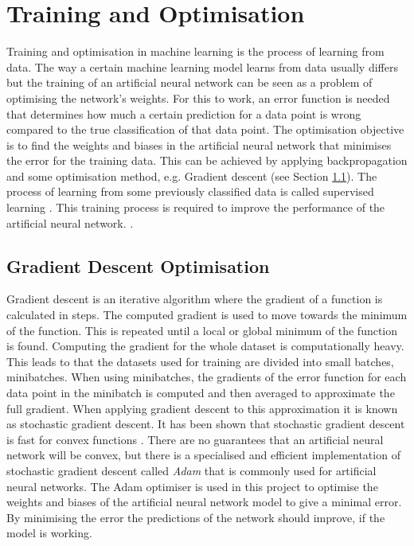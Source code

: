 \section{Training and Optimisation} \label{sec:trainingoptimisation}
Training and optimisation in machine learning is the process of learning from data. The way a certain machine learning model learns from data usually differs but the training of an artificial neural network can be seen as a problem of optimising the network's weights. For this to work, an error function is needed that determines how much a certain prediction for a data point is wrong compared to the true classification of that data point. The optimisation objective is to find the weights and biases in the artificial neural network that minimises the error for the training data. This can be achieved by applying backpropagation and some optimisation method, e.g. Gradient descent (see Section \ref{sec:gradient_descent}). The process of learning from some previously classified data is called supervised learning \parencite{lecun2015deep}. This training process is required to improve the performance of  the artificial neural network. \parencite{Goodfellow-et-al-2016}.

\subsection{Gradient Descent Optimisation}\label{sec:gradient_descent}
Gradient descent is an iterative algorithm where the gradient of a function is calculated in steps. The computed gradient is used to move towards the minimum of the function. This is repeated until a local or global minimum of the function is found. Computing the gradient for the whole dataset is computationally heavy. This leads to that the datasets used for training are divided into small batches, minibatches. When using minibatches, the gradients of the error function for each data point in the minibatch is computed and then averaged to approximate the full gradient. When applying gradient descent to this approximation it is known as stochastic gradient descent. It has been shown that stochastic gradient descent is fast for convex functions \parencite{convexSGD}. There are no guarantees that an artificial neural network will be convex, but there is a specialised and efficient implementation of stochastic gradient descent called \textit{Adam} \parencite{adamoptimizer} that is commonly used for artificial neural networks. The Adam optimiser is used in this project to optimise the weights and biases of the artificial neural network model to give a minimal error. By minimising the error the predictions of the network should improve, if the model is working.

